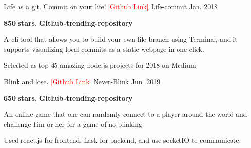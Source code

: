 

\begin{cventries}

  \cventry
    {Life as a git. Commit on your life! \href{https://github.com/ByronHsu/life-commit}{\textcolor{red}{[Github Link]}}} %
    {Life-commit} %
    {} %
    {Jan. 2018} %
    {
      \begin{cvitems} %
        \item {\textbf{850 stars, Github-trending-repository} }
        \item {A cli tool that allows you to build your own life branch using Terminal, and it supports visualizing local commits as a static webpage in one click.}
        \item {Selected as top-45 amazing node.js projects for 2018 on Medium.}
      \end{cvitems}
    }


  \cventry
    {Blink and lose. \href{https://github.com/ByronHsu/Never-Blink}{ \textcolor{red}{[Github Link]} }} %
    {Never-Blink} %
    {} %
    {Jun. 2019} %
    {
      \begin{cvitems} %
        \item {\textbf{650 stars, Github-trending-repository}}
        \item {An online game that one can randomly connect to a player around the world and challenge him or her for a game of no blinking.}
        \item {Used react.js for frontend, flask for backend, and use socketIO to communicate.}
      \end{cvitems}
    }

\end{cventries}
